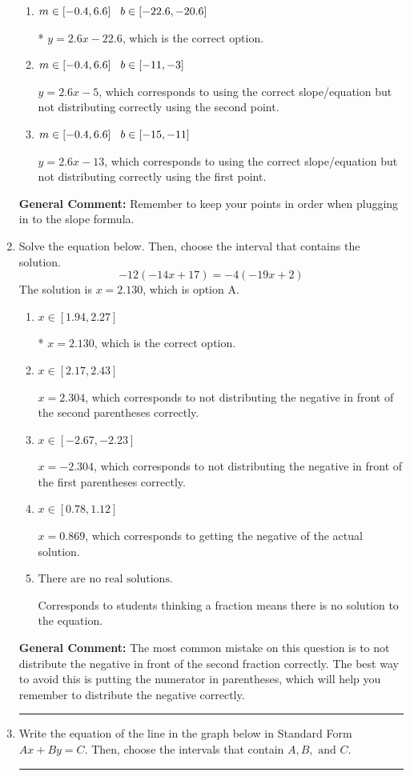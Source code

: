 \documentclass{extbook}[14pt]
\newcommand{\litem}[1]{\item #1

\rule{\textwidth}{0.4pt}}
\begin{document}
\begin{enumerate}
{\begin{enumerate}[label=\Alph*.]
 $y = 2.6x + 22.6$, which corresponds to using the correct slope and getting the negative y-intercept.
\item \( m \in [-0.4, 6.6] \hspace*{3mm} b \in [-22.6, -20.6] \)

* $y = 2.6x -22.6$, which is the correct option.
\item \( m \in [-0.4, 6.6] \hspace*{3mm} b \in [-11, -3] \)

 $y = 2.6x -5$, which corresponds to using the correct slope/equation but not distributing correctly using the second point.
\item \( m \in [-0.4, 6.6] \hspace*{3mm} b \in [-15, -11] \)

 $y = 2.6x -13$, which corresponds to using the correct slope/equation but not distributing correctly using the first point.
\end{enumerate}

\textbf{General Comment:} Remember to keep your points in order when plugging in to the slope formula.
}
\litem{
Solve the equation below. Then, choose the interval that contains the solution.
\[ -12(-14x + 17) = -4(-19x + 2) \]The solution is \( x = 2.130 \), which is option A.\begin{enumerate}[label=\Alph*.]
\item \( x \in [1.94, 2.27] \)

* $x = 2.130$, which is the correct option.
\item \( x \in [2.17, 2.43] \)

$x = 2.304$, which corresponds to not distributing the negative in front of the second parentheses correctly.
\item \( x \in [-2.67, -2.23] \)

$x = -2.304$, which corresponds to not distributing the negative in front of the first parentheses correctly.
\item \( x \in [0.78, 1.12] \)

$x = 0.869$, which corresponds to getting the negative of the actual solution.
\item \( \text{There are no real solutions.} \)

Corresponds to students thinking a fraction means there is no solution to the equation.
\end{enumerate}

\textbf{General Comment:} The most common mistake on this question is to not distribute the negative in front of the second fraction correctly. The best way to avoid this is putting the numerator in parentheses, which will help you remember to distribute the negative correctly.
}
\litem{
Write the equation of the line in the graph below in Standard Form $Ax+By=C$. Then, choose the intervals that contain $A, B, \text{ and } C$.

}
\end{enumerate}
\end{document}
